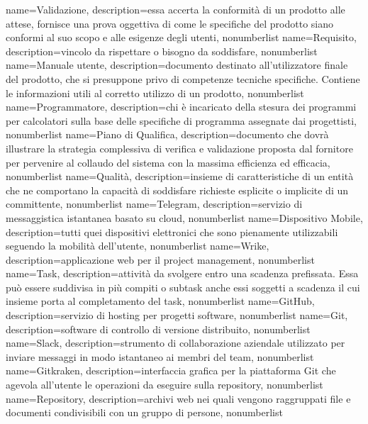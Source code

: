 {
name={Validazione},
description={essa accerta la conformità di un prodotto alle attese, fornisce una prova oggettiva di come le specifiche del prodotto siano conformi al suo scopo e alle esigenze degli utenti},
nonumberlist 
}
{
name={Requisito},
description={vincolo da rispettare o bisogno da soddisfare},
nonumberlist 
}
{
name={Manuale utente},
description={documento destinato all'utilizzatore finale del prodotto, che si presuppone privo di competenze tecniche specifiche. Contiene le informazioni utili al corretto utilizzo di un prodotto},
nonumberlist 
}
{
name={Programmatore},
description={chi è incaricato della stesura dei programmi per calcolatori sulla base delle specifiche di programma assegnate dai progettisti},
nonumberlist 
}
{
name={Piano di Qualifica},
description={documento che dovrà illustrare la strategia complessiva di verifica e validazione proposta dal fornitore per pervenire al collaudo del sistema con la massima efficienza ed efficacia},
nonumberlist 
}
{
name={Qualità},
description={insieme di caratteristiche di un entità che ne comportano la capacità di soddisfare richieste esplicite o implicite di un committente},
nonumberlist 
}
{
name={Telegram},
description={servizio di messaggistica istantanea basato su cloud},
nonumberlist 
}
{
name={Dispositivo Mobile},
description={tutti quei dispositivi elettronici che sono pienamente utilizzabili seguendo la mobilità dell'utente},
nonumberlist 
}
{
name={Wrike},
description={applicazione web per il project management},
nonumberlist 
}
{
name={Task},
description={attività da svolgere entro una scadenza prefissata. Essa può essere suddivisa in più compiti o subtask anche essi soggetti a scadenza il cui insieme porta al completamento del task},
nonumberlist 
}
{
name={GitHub},
description={servizio di hosting per progetti software},
nonumberlist 
}
{
name={Git},
description={software di controllo di versione distribuito},
nonumberlist
}
{
name={Slack},
description={strumento di collaborazione aziendale utilizzato per inviare messaggi in modo istantaneo ai membri del team},
nonumberlist
}
{
name={Gitkraken},
description={interfaccia grafica per la piattaforma Git che agevola all'utente le operazioni da eseguire sulla repository},
nonumberlist
}
{
name={Repository},
description={archivi web nei quali vengono raggruppati file e documenti condivisibili con un gruppo di persone},
nonumberlist
}


